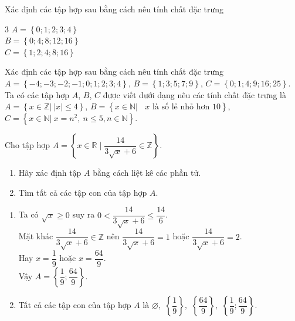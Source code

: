 \begin{bt}%
	Xác định các tập hợp sau bằng cách nêu tính chất đặc trưng
	\begin{multicols}{3}
		$A=\left\{ 0;1;2;3;4 \right\}$ \\
		$B=\left\{ 0;4;8;12;16 \right\}$ \\
		$C=\left\{ 1;2;4;8;16 \right\}$
	\end{multicols}
	
\end{bt}

\begin{bt}%
	Xác định các tập hợp sau bằng cách nêu tính chất đặc trưng\\
	$A=\left\{{-4;-3;-2;-1;0;1;2;3;4}\right\}$, $B=\left\{1;3;5;7;9\right\}$, $ C=\left\{{0;1;4;9;16;25}\right\}$.
	\loigiai
	{
		Ta có các tập hợp $A$, $B$, $C$ được viết dưới dạng nêu các tính chất đặc trưng là\\
		$A=\left\{x\in\mathbb{Z}|~|x|\le 4\right\}$, $B=\left\{x\in\mathbb{N}|~\text{ $x$ là số lẻ nhỏ hơn $10$}\right\}$, $C=\left\{x\in\mathbb{N}|~x=n^2,~n\le 5, n\in \mathbb{N}\right\}$.
	}
\end{bt}

\begin{bt}%
	Cho tập hợp $A=\left\{x \in \mathbb{R} \mid \dfrac{14}{3 \sqrt{x}+6} \in \mathbb{Z}\right\}$.
	\begin{enumerate}
		\item Hãy xác định tập $A$ bằng cách liệt kê các phần tử.
		\item Tìm tất cả các tập con của tập hợp $A$.
	\end{enumerate}
	\loigiai
	{
		\begin{enumerate}
			\item Ta có $\sqrt x\ge 0$ suy ra $ 0 <\dfrac{14}{3\sqrt x+6}\le\dfrac{14}{6}$.\\
			Mặt khác $\dfrac{14}{3\sqrt x+6}\in{\mathbb{Z}}$ nên $\dfrac{14}{3\sqrt x+6}=1$ hoặc $\dfrac{14}{3\sqrt x+6}=2$.\\
			Hay $x=\dfrac{1}{9}$ hoặc $x=\dfrac{64}{9}$.\\
			Vậy $ A=\left\{{\dfrac{1}{9};\dfrac{64}{9}}\right\}$.
			\item Tất cả các tập con của tập hợp $A$ là $\varnothing ,\,\,\left\{{\dfrac{1}{9}}\right\},\,\,\left\{{\dfrac{64}{9}}\right\},\,\,\left\{{\dfrac{1}{9};\dfrac{64}{9}}\right\}$.
		\end{enumerate}
	}
\end{bt}

